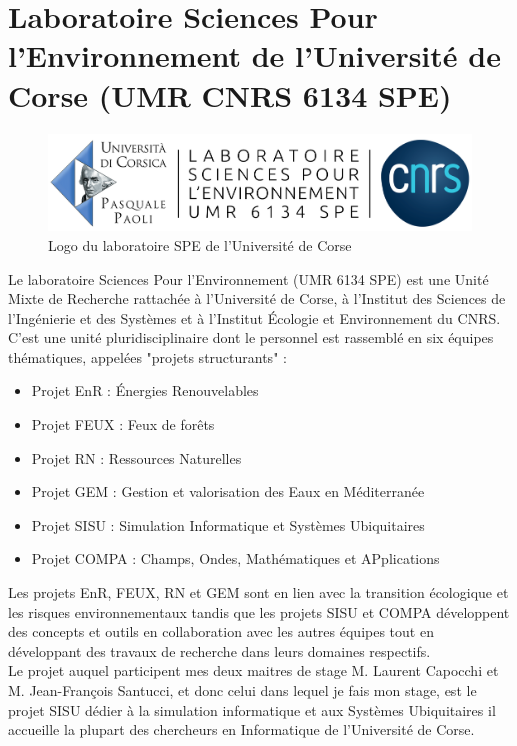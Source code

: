 \documentclass{rapport_stage}
\begin{document}
\section*{Laboratoire Sciences Pour l'Environnement de l'Université de Corse (UMR CNRS 6134 SPE)}

\begin{figure}[ht]
  \centering
  \includegraphics[width=15cm]{figures/logo_SPE.png}
  \caption{Logo du laboratoire SPE de l'Université de Corse}
  \label{fig:logo-SPE}
\end{figure}


Le laboratoire Sciences Pour l'Environnement (UMR 6134 SPE) est une Unité Mixte de Recherche
rattachée à l'Université de Corse, à l'Institut des Sciences de l'Ingénierie et des Systèmes et à
l'Institut Écologie et Environnement du CNRS. C'est une unité pluridisciplinaire dont le personnel
est rassemblé en six équipes thématiques, appelées "projets structurants"
\cite{santoni_presentation_2022} :

\begin{itemize}
  \item Projet EnR : Énergies Renouvelables
  \item Projet FEUX : Feux de forêts
  \item Projet RN : Ressources Naturelles
  \item Projet GEM : Gestion et valorisation des Eaux en Méditerranée
  \item Projet SISU : Simulation Informatique et Systèmes Ubiquitaires
  \item Projet COMPA : Champs, Ondes, Mathématiques et APplications
\end{itemize}

Les projets EnR, FEUX, RN et GEM sont en lien avec la transition écologique et les risques
environnementaux tandis que les projets SISU et COMPA développent des concepts et outils
en collaboration avec les autres équipes tout en développant des travaux de recherche dans leurs
domaines respectifs. \\


Le projet auquel participent mes deux maitres de stage M. Laurent Capocchi et M. Jean-François
Santucci, et donc celui dans lequel je fais mon stage, est le projet SISU dédier à la simulation
informatique et aux Systèmes Ubiquitaires il accueille la plupart des chercheurs en Informatique de
l'Université de Corse.
\end{document}
